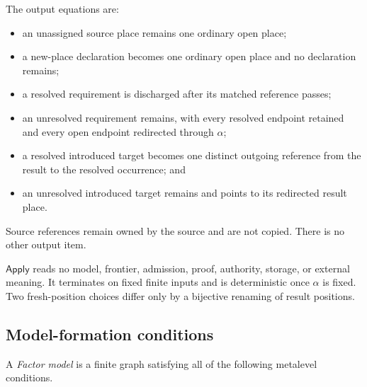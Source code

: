 \documentclass[11pt,twoside]{article}
\newcommand{\Apply}{\mathsf{Apply}}
\begin{document}
The output equations are:

\begin{itemize}[leftmargin=2em]
  \item an unassigned source place remains one ordinary open place;
  \item a new-place declaration becomes one ordinary open place and no declaration
        remains;
  \item a resolved requirement is discharged after its matched reference passes;
  \item an unresolved requirement remains, with every resolved endpoint retained
        and every open endpoint redirected through \(\alpha\);
  \item a resolved introduced target becomes one distinct outgoing reference from
        the result to the resolved occurrence; and
  \item an unresolved introduced target remains and points to its redirected
        result place.
\end{itemize}

Source references remain owned by the source and are not copied.  There is no
other output item.

\(\Apply\) reads no model, frontier, admission, proof, authority, storage, or
external meaning.  It terminates on fixed finite inputs and is deterministic once
\(\alpha\) is fixed.  Two fresh-position choices differ only by a bijective
renaming of result positions.

\subsection*{Model-formation conditions}

A \emph{Factor model} is a finite graph satisfying all of the following metalevel
conditions.
\end{document}
